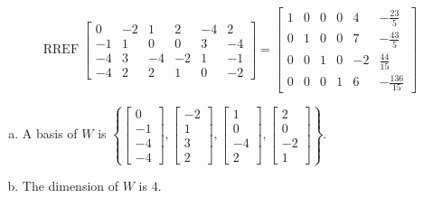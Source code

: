 \begin{exerciseAnswer} 


\[\operatorname{RREF} \left[\begin{array}{cccccc}
0 & -2 & 1 & 2 & -4 & 2 \\
-1 & 1 & 0 & 0 & 3 & -4 \\
-4 & 3 & -4 & -2 & 1 & -1 \\
-4 & 2 & 2 & 1 & 0 & -2
\end{array}\right] = \left[\begin{array}{cccccc}
1 & 0 & 0 & 0 & 4 & -\frac{23}{5} \\
0 & 1 & 0 & 0 & 7 & -\frac{43}{5} \\
0 & 0 & 1 & 0 & -2 & \frac{44}{15} \\
0 & 0 & 0 & 1 & 6 & -\frac{136}{15}
\end{array}\right] \]


\begin{enumerate}[(a)]
\item A basis of \(W\) is \( \left\{ \left[\begin{array}{c}
0 \\
-1 \\
-4 \\
-4
\end{array}\right] , \left[\begin{array}{c}
-2 \\
1 \\
3 \\
2
\end{array}\right] , \left[\begin{array}{c}
1 \\
0 \\
-4 \\
2
\end{array}\right] , \left[\begin{array}{c}
2 \\
0 \\
-2 \\
1
\end{array}\right] \right\} \).
\item The dimension of \(W\) is \( 4 \).
\end{enumerate}
    
\end{exerciseAnswer}
    
